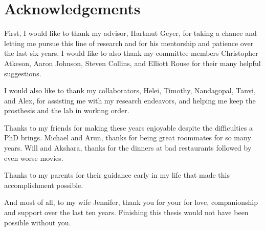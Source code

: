 \chapter*{Acknowledgements}

First, I would like to thank my advisor, Hartmut Geyer, for taking a chance and
letting me pursue this line of research and for his mentorship and patience over
the last six years. I would like to also thank my committee members Christopher
Atkeson, Aaron Johnson, Steven Collins, and Elliott Rouse for their many helpful
suggestions.

I would also like to thank my collaborators, Helei, Timothy, Nandagopal, Tanvi,
and Alex, for assisting me with my research endeavors, and helping me keep the
prosthesis and the lab in working order.

Thanks to my friends for making these years enjoyable despite the difficulties a
PhD brings. Michael and Arun, thanks for being great roommates for so many
years. Will and Akshara, thanks for the dinners at bad restaurants followed by
even worse movies.

Thanks to my parents for their guidance early in my life that made this
accomplishment possible.

And most of all, to my wife Jennifer, thank you for your for love, companionship
and support over the last ten years. Finishing this thesis would not have been
possible without you.
